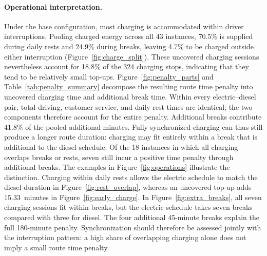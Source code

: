 \begingroup
\graphicspath{{figures/conditions/}{../figures/}}

\paragraph{Operational interpretation.}
Under the base configuration, most charging is accommodated within driver
interruptions. Pooling charged energy across all 43 instances, 70.5\% is supplied
during daily rests and 24.9\% during breaks, leaving 4.7\% to be charged outside
either interruption (Figure~\ref{fig:charge_split}). These uncovered charging
sessions nevertheless account for 18.8\% of the 324 charging stops, indicating
that they tend to be relatively small top-ups. Figure~\ref{fig:penalty_parts} and
Table~\ref{tab:penalty_summary} decompose the resulting route time penalty into
uncovered charging time and additional break time. Within every electric--diesel
pair, total driving, customer service, and daily rest times are identical; the
two components therefore account for the entire penalty. Additional breaks
contribute 41.8\% of the pooled additional minutes. Fully synchronized charging
can thus still produce a longer route duration: charging may fit entirely
within a break that is additional to the diesel schedule. Of the 18 instances
in which all charging overlaps breaks or rests, seven still incur a positive
time penalty through additional breaks. The examples in
Figure~\ref{fig:operations} illustrate the distinction. Charging within daily
rests allows the electric schedule to match the diesel duration in
Figure~\ref{fig:rest_overlap}, whereas an uncovered top-up adds 15.33~minutes in
Figure~\ref{fig:early_charge}. In Figure~\ref{fig:extra_breaks}, all seven charging
sessions fit within breaks, but the electric schedule takes seven breaks
compared with three for diesel. The four additional 45-minute breaks explain
the full 180-minute penalty. Synchronization should therefore be assessed
jointly with the interruption pattern: a high share of overlapping charging
alone does not imply a small route time penalty.

